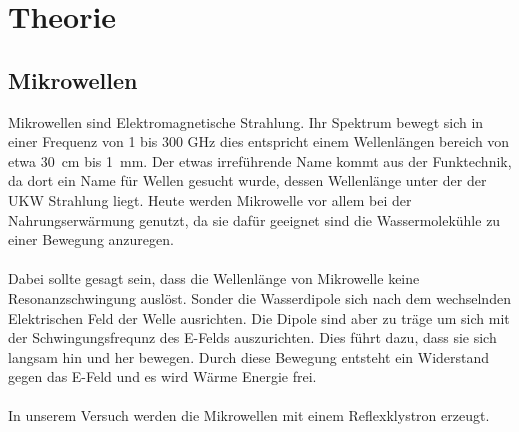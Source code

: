 \section{Theorie}
\label{sec:Theorie}

\subsection{Mikrowellen}
Mikrowellen sind Elektromagnetische Strahlung.
Ihr Spektrum bewegt sich in einer Frequenz von 1 bis 300 \si{\giga\Hz} dies entspricht einem Wellenlängen bereich von etwa \SI{30}{\centi\meter} bis \SI{1}{\milli\meter}.
Der etwas irreführende Name kommt aus der Funktechnik, da dort ein Name für Wellen gesucht wurde, dessen Wellenlänge unter der der UKW Strahlung liegt. 
Heute werden Mikrowelle vor allem bei der Nahrungserwärmung genutzt, da sie dafür geeignet sind die Wassermolekühle zu einer Bewegung anzuregen.
\\\\
Dabei sollte gesagt sein, dass die Wellenlänge von Mikrowelle keine Resonanzschwingung auslöst. 
Sonder die Wasserdipole sich nach dem wechselnden Elektrischen Feld der Welle ausrichten.
Die Dipole sind aber zu träge um sich mit der Schwingungsfrequnz des E-Felds auszurichten. 
Dies führt dazu, dass sie sich langsam hin und her bewegen.
Durch diese Bewegung entsteht ein Widerstand gegen das E-Feld und es wird Wärme Energie frei.
\\\\
In unserem Versuch werden die Mikrowellen mit einem Reflexklystron erzeugt.

